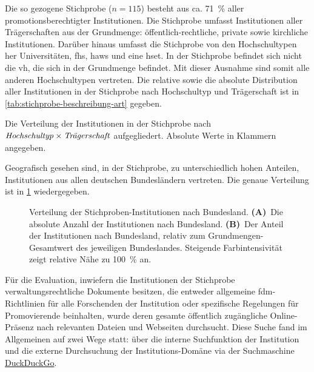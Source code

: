 Die so gezogene Stichprobe ($n=115$) besteht aus ca. \SI{71}{\percent} aller promotionsberechtigter Institutionen.
Die Stichprobe umfasst Institutionen aller Trägerschaften aus der Grundmenge: öffentlich-rechtliche, private sowie kirchliche Institutionen.
Darüber hinaus umfasst die Stichprobe von den Hochschultypen her Universitäten, \glspl{fh}, \glspl{haw} und eine \gls{hset}.
In der Stichprobe befindet sich nicht die \gls{vh}, die sich in der Grundmenge befindet.
Mit dieser Ausnahme sind somit alle anderen Hochschultypen vertreten.
Die relative sowie die absolute Distribution aller Institutionen in der Stichprobe nach Hochschultyp und Trägerschaft ist in \cref{tab:stichprobe-beschreibung-art} gegeben.
\begin{table}[!htbp]
	\caption{Die Verteilung der Institutionen in der Stichprobe nach $\text{\textit{Hochschultyp}}\times\text{\textit{Trägerschaft}}$ aufgegliedert. Absolute Werte in Klammern angegeben.}
    
	\label{tab:stichprobe-beschreibung-art}
\end{table}

\noindent Geografisch gesehen sind, in der Stichprobe, zu unterschiedlich hohen Anteilen, Institutionen aus allen deutschen Bundesländern vertreten.
Die genaue Verteilung ist in \cref{fig:DE-stichprobe-beschreibung} wiedergegeben.
\begin{figure}[!htbp]
    \centering
    
    \caption{Verteilung der Stichproben-Institutionen nach Bundesland. \textbf{(A)}~Die absolute Anzahl der Institutionen nach Bundesland.
    \textbf{(B)}~Der Anteil der Institutionen nach Bundesland, relativ zum Grundmengen-Gesamtwert des jeweiligen Bundeslandes.
    Steigende Farbintensivität zeigt relative Nähe zu \SI{100}{\percent} an.}
    \label{fig:DE-stichprobe-beschreibung}
\end{figure}

Für die Evaluation, inwiefern die Institutionen der Stichprobe verwaltungsrechtliche Dokumente besitzen, die entweder allgemeine \gls{fdm}-Richtlinien für alle Forschenden der Institution oder spezifische Regelungen für Promovierende beinhalten, wurde deren gesamte öffentlich zugängliche Online-Präsenz nach relevanten Dateien und Webseiten durchsucht.
Diese Suche fand im Allgemeinen auf zwei Wege statt: über die interne Suchfunktion der Institution und die externe Durchsuchung der Institutions-Domäne via der Suchmaschine \href{https://www.duckduckgo.com/}{DuckDuckGo}.


